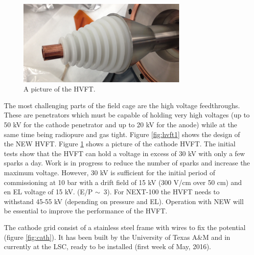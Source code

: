 \begin{figure}[hpt!]
\centering
\includegraphics[width=0.75\textwidth]{img2/HVFT2.png}
\caption{A picture of the HVFT.} \label{fig:hvft_tip}
\end{figure}


The most challenging parts of the field cage are the high voltage feedthroughs. These are penetrators which must be capable of holding very high voltages (up to 50 kV for the cathode penetrator and up to 20 kV for the anode) while at the same time being radiopure and gas tight. Figure \ref{fig:hvft1} shows the design of the NEW HVFT. Figure 
\ref{fig:hvft_tip} shows a picture of the cathode HVFT. The initial tests show that the HVFT can hold a voltage in excess of 30 kV with only a few sparks a day. Work is in progress to reduce the number of sparks and increase the maximum voltage. However, 30 kV is sufficient for the initial period of commissioning at 10 bar with a drift field of 15 kV (300 V/cm over 50 cm) and en EL voltage of 15 kV. (E/P $\sim$~3). For NEXT-100 the HVFT needs to withstand 45-55 kV (depending on pressure and EL). Operation with NEW will be essential to improve the performance of the HVFT. 

The cathode grid consist of a stainless steel frame with wires to fix the potential (figure \ref{fig:cath}). It has
been built by the University of Texas A\&M and in currently at the LSC, ready to be installed (first week of May, 2016).

